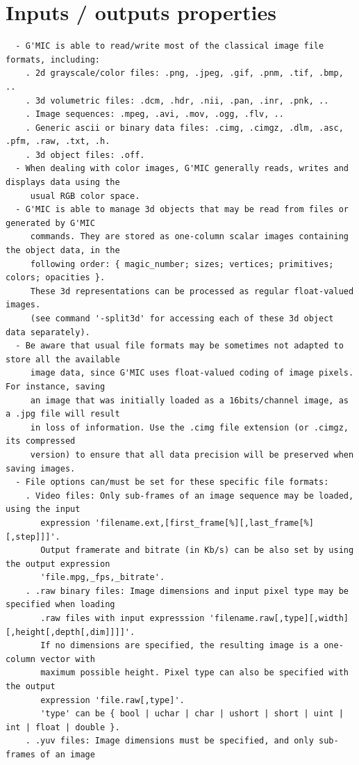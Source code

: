 \documentclass[a4paper,11pt,twoside]{book}
\begin{document}
\section{Inputs / outputs properties}
\small
\begin{lstlisting}
  - G'MIC is able to read/write most of the classical image file formats, including: 
    . 2d grayscale/color files: .png, .jpeg, .gif, .pnm, .tif, .bmp, .. 
    . 3d volumetric files: .dcm, .hdr, .nii, .pan, .inr, .pnk, .. 
    . Image sequences: .mpeg, .avi, .mov, .ogg, .flv, .. 
    . Generic ascii or binary data files: .cimg, .cimgz, .dlm, .asc, .pfm, .raw, .txt, .h. 
    . 3d object files: .off. 
  - When dealing with color images, G'MIC generally reads, writes and displays data using the 
     usual RGB color space. 
  - G'MIC is able to manage 3d objects that may be read from files or generated by G'MIC 
     commands. They are stored as one-column scalar images containing the object data, in the 
     following order: { magic_number; sizes; vertices; primitives; colors; opacities }. 
     These 3d representations can be processed as regular float-valued images. 
     (see command '-split3d' for accessing each of these 3d object data separately). 
  - Be aware that usual file formats may be sometimes not adapted to store all the available 
     image data, since G'MIC uses float-valued coding of image pixels. For instance, saving 
     an image that was initially loaded as a 16bits/channel image, as a .jpg file will result 
     in loss of information. Use the .cimg file extension (or .cimgz, its compressed 
     version) to ensure that all data precision will be preserved when saving images. 
  - File options can/must be set for these specific file formats: 
    . Video files: Only sub-frames of an image sequence may be loaded, using the input 
       expression 'filename.ext,[first_frame[%][,last_frame[%][,step]]]'. 
       Output framerate and bitrate (in Kb/s) can be also set by using the output expression 
       'file.mpg,_fps,_bitrate'. 
    . .raw binary files: Image dimensions and input pixel type may be specified when loading 
       .raw files with input expresssion 'filename.raw[,type][,width][,height[,depth[,dim]]]]'. 
       If no dimensions are specified, the resulting image is a one-column vector with 
       maximum possible height. Pixel type can also be specified with the output 
       expression 'file.raw[,type]'. 
       'type' can be { bool | uchar | char | ushort | short | uint | int | float | double }. 
    . .yuv files: Image dimensions must be specified, and only sub-frames of an image 

\end{lstlisting}
\end{document}

